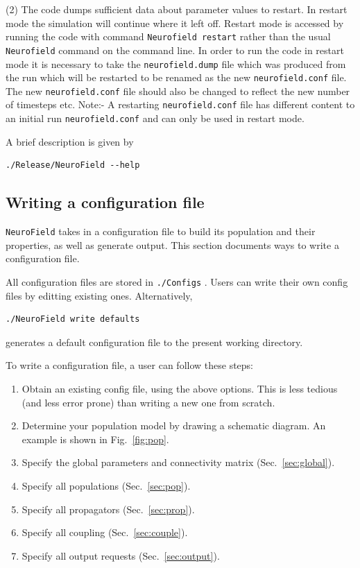 \documentclass[12pt,a4paper]{article}
\newcommand{\type}[1]{ {\small\small\tt #1} }
\begin{document}
(2) The code dumps sufficient data about parameter values to restart. In restart mode the simulation will continue where it left off. Restart mode is accessed by running the code with command \type{Neurofield restart} rather than the usual \type{Neurofield} command on the command line. In order to run the code in restart mode it is necessary to take the \type{neurofield.dump} file which was produced from the run which will be restarted to be renamed as the new \type{neurofield.conf} file. The new \type{neurofield.conf} file should also be changed to reflect the new number of timesteps etc.  Note:- A restarting \type{neurofield.conf} file has different content to an initial run \type{neurofield.conf} and can only be used in restart mode.

A brief description is given by
\begin{lstlisting}
./Release/NeuroField --help
\end{lstlisting}

\subsection{Writing a configuration file}

\type{NeuroField} takes in a configuration file to build its population and their properties, as well as generate output. This section documents ways to write a configuration file.

All configuration files are stored in \type{./Configs}. Users can write their own config files by editting existing ones. Alternatively,
\begin{lstlisting}
./NeuroField write defaults
\end{lstlisting}
generates a default configuration file to the present working directory.

To write a configuration file, a user can follow these steps:
\begin{enumerate}
\item Obtain an existing config file, using the above options. This is less tedious (and less error prone) than writing a new one from scratch.
\item Determine your population model by drawing a schematic diagram. An example is shown in Fig.~\ref{fig:pop}.
\item Specify the global parameters and connectivity matrix (Sec.~\ref{sec:global}).
\item Specify all populations (Sec.~\ref{sec:pop}).
\item Specify all propagators (Sec.~\ref{sec:prop}).
\item Specify all coupling (Sec.~\ref{sec:couple}).
\item Specify all output requests (Sec.~\ref{sec:output}).
\end{enumerate}
\end{document}
